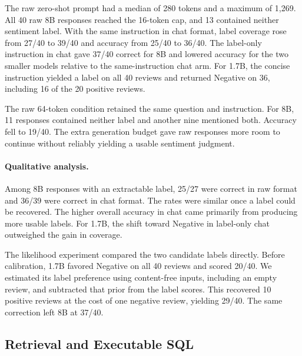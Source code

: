 \documentclass{article}
\begin{document}
The raw zero-shot prompt had a median of 280 tokens and a maximum of 1,269. All 40 raw 8B responses
reached the 16-token cap, and 13 contained neither sentiment label. With the same instruction in
chat format, label coverage rose from 27/40 to 39/40 and accuracy from 25/40 to 36/40. The label-only
instruction in chat gave 37/40 correct for 8B and lowered accuracy for the two smaller models
relative to the same-instruction chat arm. For 1.7B, the concise instruction yielded a label
on all 40 reviews and returned Negative on 36, including 16 of the 20 positive reviews.

The raw 64-token condition retained the same question and instruction. For 8B, 11 responses
contained neither label and another nine mentioned both. Accuracy fell to 19/40. The extra
generation budget gave raw responses more room to continue without reliably yielding a usable
sentiment judgment.

\paragraph{Qualitative analysis.}

Among 8B responses with an extractable label, 25/27 were correct in raw format and 36/39
were correct in chat format. The rates were similar once a label could be recovered. The
higher overall accuracy in chat came primarily from producing more usable labels. For 1.7B,
the shift toward Negative in label-only chat outweighed the gain in coverage.

The likelihood experiment compared the two candidate labels directly. Before calibration,
1.7B favored Negative on all 40 reviews and scored 20/40. We estimated its label preference
using content-free inputs, including an empty review, and subtracted that prior from the label
scores. This recovered 10 positive reviews at the cost of one negative review, yielding 29/40.
The same correction left 8B at 37/40.

\clearpage


\subsection{Retrieval and Executable SQL}
\end{document}
